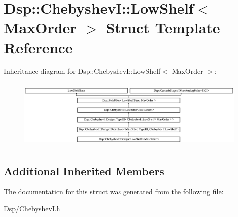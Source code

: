 \hypertarget{structDsp_1_1ChebyshevI_1_1LowShelf}{\section{Dsp\-:\-:Chebyshev\-I\-:\-:Low\-Shelf$<$ Max\-Order $>$ Struct Template Reference}
\label{structDsp_1_1ChebyshevI_1_1LowShelf}
}
Inheritance diagram for Dsp\-:\-:Chebyshev\-I\-:\-:Low\-Shelf$<$ Max\-Order $>$\-:\begin{figure}[H]
\begin{center}
\leavevmode
\includegraphics[height=3.428571cm]{structDsp_1_1ChebyshevI_1_1LowShelf}
\end{center}
\end{figure}
\subsection*{Additional Inherited Members}


The documentation for this struct was generated from the following file\-:\begin{DoxyCompactItemize}
\item 
Dsp/Chebyshev\-I.\-h\end{DoxyCompactItemize}
